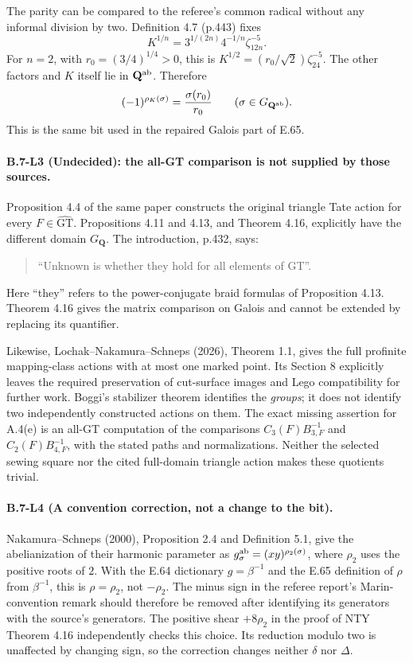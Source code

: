 The parity can be compared to the referee's common radical without
any informal division by two. Definition 4.7 (p.443) fixes
\[
 K^{1/n}=3^{1/(2n)}4^{-1/n}\zeta_{12n}^{-5}.
\]
For $n=2$, with $r_0=(3/4)^{1/4}>0$, this is
$K^{1/2}=(r_0/\sqrt2)\zeta_{24}^{-5}$. The other factors and
$K$ itself lie in $\mathbf Q^{\rm ab}$. Therefore
\[
 (-1)^{\rho_K(\sigma)}=\frac{\sigma(r_0)}{r_0}
       \qquad(\sigma\in G_{\mathbf Q^{\rm ab}}).
\]
This is the same bit used in the repaired Galois part of E.65.

\paragraph{B.7-L3 (Undecided): the all-GT comparison is not supplied by those sources.}
Proposition 4.4 of the same paper constructs the original triangle
Tate action for every $F\in\widehat{\mathrm{GT}}$. Propositions
4.11 and 4.13, and Theorem 4.16, explicitly have the different
domain $G_{\mathbf Q}$. The introduction, p.432, says:
\begin{quote}
``Unknown is whether they hold for all elements of GT''.
\end{quote}
Here ``they'' refers to the power-conjugate braid formulas of
Proposition 4.13. Theorem 4.16 gives the matrix comparison on
Galois and cannot be extended by replacing its quantifier.

Likewise, Lochak--Nakamura--Schneps (2026), Theorem 1.1, gives
the full profinite mapping-class actions with at most one marked
point. Its Section 8 explicitly leaves the required preservation
of cut-surface images and Lego compatibility for further work.
Boggi's stabilizer theorem identifies the \emph{groups}; it does
not identify two independently constructed actions on them.
The exact missing assertion for A.4(e) is an all-GT computation
of the comparisons $C_3(F)B_{3,F}^{-1}$ and
$C_2(F)B_{4,F}^{-1}$, with the stated paths and normalizations.
Neither the selected sewing square nor the cited full-domain
triangle action makes these quotients trivial.

\paragraph{B.7-L4 (A convention correction, not a change to the bit).}
Nakamura--Schneps (2000), Proposition 2.4 and Definition 5.1,
give the abelianization of their harmonic parameter as
$g_\sigma^{\rm ab}=(xy)^{\rho_2(\sigma)}$, where $\rho_2$
uses the positive roots of $2$. With the E.64 dictionary
$g=\beta^{-1}$ and the E.65 definition of $\rho$ from
$\beta^{-1}$, this is $\rho=\rho_2$, not $-\rho_2$.
The minus sign in the referee report's Marin-convention remark
should therefore be removed after identifying its generators
with the source's generators. The positive shear $+8\rho_2$
in the proof of NTY Theorem 4.16 independently checks this
choice. Its reduction modulo two is unaffected by changing
sign, so the correction changes neither $\delta$ nor $\Delta$.

